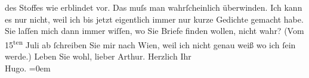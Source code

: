 \begin{ledgroupsized}[t]{13cm}
                    des Stoffes wie erblindet vor. Das muſs man wahrſcheinlich überwinden. Ich kann
                    es nur nicht, weil ich bis jetzt eigentlich immer nur {\pb}kurze Gedichte gemacht
                    habe.\pend
           \pstart
           Sie laſſen mich dann immer wiſſen, wo Sie Briefe finden wollen, nicht wahr? (Vom
                            15\textsuperscript{ten} Juli ab ſchreiben Sie mir
                    nach Wien, weil ich nicht genau weiß wo ich
                    ſein werde.) Leben Sie wohl, lieber Arthur.\pend
           \pstart
           Herzlich Ihr{\\[\baselineskip]}\spacefill\mbox{Hugo.}\pend
           \leftskip=0em{}
         
         \endnumbering{}\end{ledgroupsized}  \newcommand{\dateiname}{L00556}\newcommand{\titel}{Hugo von Hofmannsthal an Arthur Schnitzler, 27. 6. [1896]}\newcommand{\editorInnen}{Martin Anton Müller und Gerd-Hermann Susen}
      